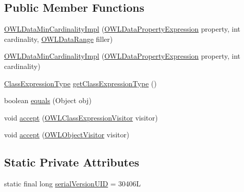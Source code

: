 \subsection*{Public Member Functions}
\begin{DoxyCompactItemize}
\item 
\hyperlink{classuk_1_1ac_1_1manchester_1_1cs_1_1owl_1_1owlapi_1_1_o_w_l_data_min_cardinality_impl_ad633ddfb7c72ddbcdcd820b3c4f661b0}{O\-W\-L\-Data\-Min\-Cardinality\-Impl} (\hyperlink{interfaceorg_1_1semanticweb_1_1owlapi_1_1model_1_1_o_w_l_data_property_expression}{O\-W\-L\-Data\-Property\-Expression} property, int cardinality, \hyperlink{interfaceorg_1_1semanticweb_1_1owlapi_1_1model_1_1_o_w_l_data_range}{O\-W\-L\-Data\-Range} filler)
\item 
\hyperlink{classuk_1_1ac_1_1manchester_1_1cs_1_1owl_1_1owlapi_1_1_o_w_l_data_min_cardinality_impl_a5a9cdc8d0cfbd13a35b7209ee0730206}{O\-W\-L\-Data\-Min\-Cardinality\-Impl} (\hyperlink{interfaceorg_1_1semanticweb_1_1owlapi_1_1model_1_1_o_w_l_data_property_expression}{O\-W\-L\-Data\-Property\-Expression} property, int cardinality)
\item 
\hyperlink{enumorg_1_1semanticweb_1_1owlapi_1_1model_1_1_class_expression_type}{Class\-Expression\-Type} \hyperlink{classuk_1_1ac_1_1manchester_1_1cs_1_1owl_1_1owlapi_1_1_o_w_l_data_min_cardinality_impl_ace0588a7b9e41a68cc811048985ae3f9}{get\-Class\-Expression\-Type} ()
\item 
boolean \hyperlink{classuk_1_1ac_1_1manchester_1_1cs_1_1owl_1_1owlapi_1_1_o_w_l_data_min_cardinality_impl_a66c28ab7f5e4a853ed7868c38aed7c0f}{equals} (Object obj)
\item 
void \hyperlink{classuk_1_1ac_1_1manchester_1_1cs_1_1owl_1_1owlapi_1_1_o_w_l_data_min_cardinality_impl_ab7f7b01f93c4dedccba440503c9f2971}{accept} (\hyperlink{interfaceorg_1_1semanticweb_1_1owlapi_1_1model_1_1_o_w_l_class_expression_visitor}{O\-W\-L\-Class\-Expression\-Visitor} visitor)
\item 
void \hyperlink{classuk_1_1ac_1_1manchester_1_1cs_1_1owl_1_1owlapi_1_1_o_w_l_data_min_cardinality_impl_a52ff5241f7430f59619cc45ca9d4891b}{accept} (\hyperlink{interfaceorg_1_1semanticweb_1_1owlapi_1_1model_1_1_o_w_l_object_visitor}{O\-W\-L\-Object\-Visitor} visitor)
\end{DoxyCompactItemize}
\subsection*{Static Private Attributes}
\begin{DoxyCompactItemize}
\item 
static final long \hyperlink{classuk_1_1ac_1_1manchester_1_1cs_1_1owl_1_1owlapi_1_1_o_w_l_data_min_cardinality_impl_ac3b6ebf1c15ae6a421677d257fdfdfb1}{serial\-Version\-U\-I\-D} = 30406\-L
\end{DoxyCompactItemize}
